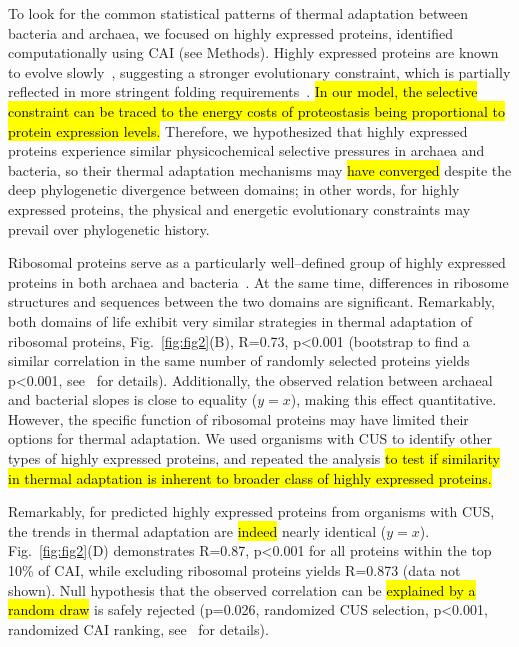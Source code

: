 \documentclass[10pt,letterpaper]{article}
\begin{document}
To look for the common statistical patterns of thermal adaptation between bacteria and archaea, we focused on highly expressed proteins, identified computationally using CAI (see Methods). Highly expressed proteins are known to evolve slowly~\cite{Pal2001Highly,Rocha2004An}, suggesting a stronger evolutionary constraint, which is partially reflected in more stringent folding requirements~\cite{Serohijos2012Protein,Drummond2005Why,Drummond2008MistranslationInduced}. %
\hl{In our model, the selective constraint can be traced to the energy costs of proteostasis being proportional to protein expression levels.} Therefore, we hypothesized that highly expressed proteins experience similar physicochemical selective pressures in archaea and bacteria, so their thermal adaptation mechanisms may \hl{have converged} despite the deep phylogenetic divergence between domains; in other words, for highly expressed proteins, the physical and energetic evolutionary constraints may prevail over phylogenetic history.

Ribosomal proteins serve as a particularly well--defined group of highly expressed proteins in both archaea and bacteria~\cite{Karlin2005Predicted}. At the same time, differences in ribosome structures and sequences between the two domains are significant. Remarkably, both domains of life exhibit very similar strategies in thermal adaptation of ribosomal proteins, Fig.~\ref{fig:fig2}(B), R=0.73, p\textless 0.001 (bootstrap to find a similar correlation in the same number of randomly selected proteins yields p\textless0.001, see~ for details). Additionally, the observed relation between archaeal and bacterial slopes is close to equality ($y=x$), making this effect quantitative. However, the specific function of ribosomal proteins may have limited their options for thermal adaptation. We used organisms with CUS to identify other types of highly expressed proteins, and repeated the analysis \hl{to test if similarity in thermal adaptation is inherent to broader class of highly expressed proteins.}

Remarkably, for predicted highly expressed proteins from organisms with CUS, the trends in thermal adaptation are \hl{indeed} nearly identical ($y=x$). Fig.~\ref{fig:fig2}(D) demonstrates R=0.87, p\textless 0.001 for all proteins within the top 10\% of CAI, while excluding ribosomal proteins yields R=0.873 (data not shown). Null hypothesis that the observed correlation can be \hl{explained by a random draw} is safely rejected (p=0.026, randomized CUS selection,  p\textless0.001, randomized CAI ranking, see~ for details).
\end{document}
